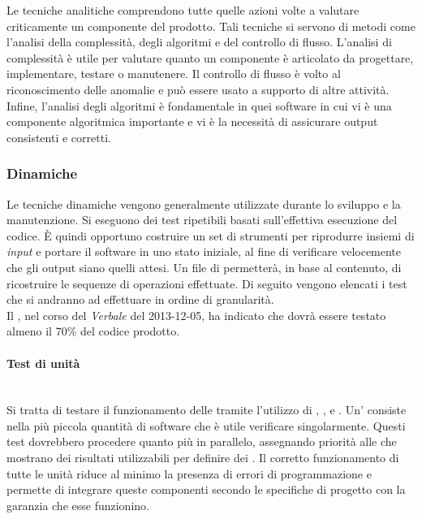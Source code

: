 		Le tecniche analitiche comprendono tutte quelle azioni volte a valutare criticamente un componente del prodotto. Tali tecniche si servono di metodi come l'analisi della complessità, degli algoritmi e del controllo di flusso. L'analisi di complessità è utile per valutare quanto un componente è articolato da progettare, implementare, testare o manutenere. Il controllo di flusso è volto al riconoscimento delle anomalie e può essere usato a supporto di altre attività. Infine, l'analisi degli algoritmi è fondamentale in quei software in cui vi è una componente algoritmica importante e vi è la necessità di assicurare output consistenti e corretti. 
				
		\subsubsection{Dinamiche}

		Le tecniche dinamiche vengono generalmente utilizzate durante lo sviluppo e la manutenzione. Si eseguono dei test ripetibili basati sull'effettiva esecuzione del codice. È quindi opportuno costruire un set di strumenti per riprodurre insiemi di \emph{input} e portare il software in uno stato iniziale, al fine di verificare velocemente che gli output siano quelli attesi. Un file di  permetterà, in base al contenuto, di ricostruire le sequenze di operazioni effettuate. Di seguito vengono elencati i test che si andranno ad effettuare in ordine di granularità.\\
		Il , nel corso del \textit{Verbale} del 2013-12-05, ha indicato che dovrà essere testato almeno il  70\% del codice prodotto.
		
			\paragraph{Test di unità} \mbox{} \\

			Si tratta di testare il funzionamento delle  tramite l'utilizzo di , , e . Un' consiste nella più piccola quantità di software che è utile verificare singolarmente.
			Questi test dovrebbero procedere quanto più in parallelo, assegnando priorità alle  che mostrano dei risultati utilizzabili per definire dei . Il corretto funzionamento di tutte le unità riduce al minimo la presenza di errori di programmazione e permette di integrare queste componenti secondo le specifiche di progetto con la garanzia che esse funzionino.
			 
